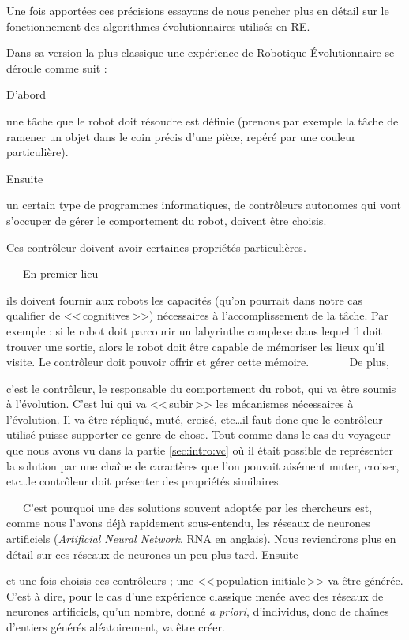Une fois apportées ces précisions essayons de nous pencher plus en détail sur le fonctionnement des algorithmes évolutionnaires utilisés en RE.

Dans sa version la plus classique une expérience de Robotique Évolutionnaire se déroule comme suit \citep[pour certains exemples historiques de la littérature]{nolfi96learning,floreano94automaticcreationofanautonomousagen,jakobi97evolutionaryroboticsandtheradicalenvelopeofnoisehypothesis}:

\begin{inparaenum}[(\itshape 1\upshape)]

D'abord \item une tâche que le robot doit résoudre est définie (prenons par exemple la tâche de ramener un objet dans le coin précis d'une pièce, repéré par une couleur particulière).
	

	
Ensuite \item un certain type de programmes informatiques, de contrôleurs autonomes qui vont s'occuper de gérer le comportement du robot, doivent être choisis.

Ces contrôleur doivent avoir certaines propriétés particulières.
   \begin{inparaenum}
   En premier lieu \item ils doivent fournir aux robots les capacités (qu'on pourrait dans notre cas qualifier de <<\,cognitives\,>>) nécessaires à l'accomplissement de la tâche. Par exemple : si le robot doit parcourir un labyrinthe complexe dans lequel il doit trouver une sortie, alors le robot doit être capable de mémoriser les lieux qu'il visite. Le contrôleur doit pouvoir offrir et gérer cette mémoire.
       De plus,\item c'est le contrôleur, le responsable du comportement du robot, qui va être soumis à l'évolution. C'est lui qui va <<\,subir\,>> les mécanismes nécessaires à l'évolution. Il va être répliqué, muté, croisé, etc\ldots il faut donc que le contrôleur utilisé puisse supporter ce genre de chose. Tout comme dans le cas du voyageur que nous avons vu dans la partie \ref{sec:intro:vc} où il était possible de représenter la solution par une chaîne de caractères que l'on pouvait aisément muter, croiser, etc\ldots le contrôleur doit présenter des propriétés similaires.
   \end{inparaenum}
   C'est pourquoi une des solutions souvent adoptée par les chercheurs est, comme nous l'avons déjà rapidement sous-entendu, les réseaux de neurones artificiels (\emph{Artificial Neural Network}, RNA en anglais). Nous reviendrons plus en détail sur ces réseaux de neurones un peu plus tard. \label{it:RNA}
Ensuite \item et une fois choisis ces contrôleurs ; une <<\,population initiale\,>> va être générée. C'est à dire, pour le cas d'une expérience classique menée avec des réseaux de neurones artificiels, qu'un nombre, donné \emph{a priori}, d'individus, donc de chaînes d'entiers générés aléatoirement, va être créer.


\end{inparaenum}
